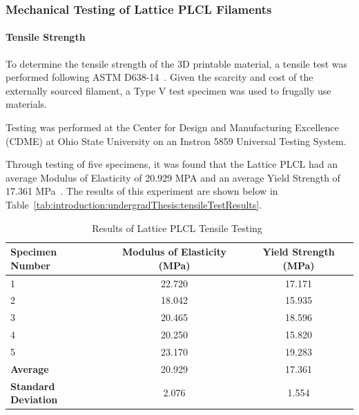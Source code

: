 \subsubsection{Mechanical Testing of Lattice PLCL Filaments\label{sec:introduction:priorWork:undergradThesis:mechTesting}}

\paragraph*{Tensile Strength\label{sec:introduction:priorWork:undergradThesis:mechTesting:tensileStrength}}

To determine the tensile strength of the 3D printable material, a tensile test was performed following ASTM D638-14~\cite{RefWorks:RefID:4-test}. Given the scarcity and cost of the externally sourced filament, a Type V test specimen was used to frugally use materials.

Testing was performed at the Center for Design and Manufacturing Excellence (CDME) at Ohio State University on an Instron 5859 Universal Testing System.

Through testing of five specimens, it was found that the Lattice PLCL had an average Modulus of Elasticity of 20.929 MPA and an average Yield Strength of 17.361 MPa~\cite{RefWorks:RefID:370-einsteinisaac}. The results of this experiment are shown below in Table~\ref{tab:introduction:undergradThesis:tensileTestResults}.

\begin{table}[H]
        \centering
        \caption{Results of Lattice PLCL Tensile Testing~\cite{RefWorks:RefID:370-einsteinisaac}}
        \label{tab:introduction:undergradThesis:tensileTestResults}
        \begin{tabular}{lcc}
                \hline
                \textbf{Specimen Number}    & \textbf{Modulus of Elasticity (MPa)} & \textbf{Yield Strength (MPa)} \\
                \hline
                1                           & 22.720                               & 17.171                        \\
                2                           & 18.042                               & 15.935                        \\
                3                           & 20.465                               & 18.596                        \\
                4                           & 20.250                               & 15.820                        \\
                5                           & 23.170                               & 19.283                        \\
                \hline
                \textbf{Average}            & 20.929                               & 17.361                        \\
                \textbf{Standard Deviation} & 2.076                                & 1.554                         \\
                \hline
        \end{tabular}
        \label{tab:mechanical_properties}
\end{table}

